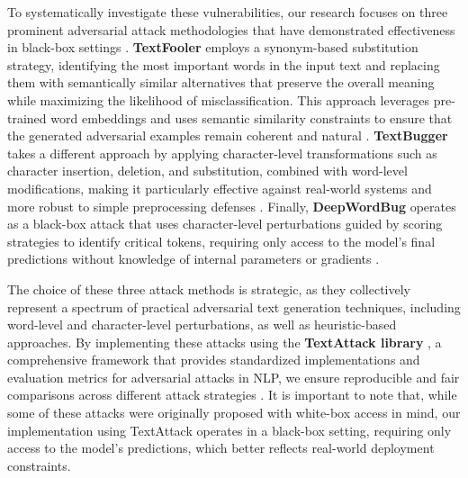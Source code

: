 \documentclass[../main.tex]{subfiles}
\begin{document}
To systematically investigate these vulnerabilities, our research focuses on three prominent adversarial attack methodologies that have demonstrated effectiveness in black-box settings \cite{morris2020textattack}. \textbf{TextFooler} \cite{jin2019textfooler} employs a synonym-based substitution strategy, identifying the most important words in the input text and replacing them with semantically similar alternatives that preserve the overall meaning while maximizing the likelihood of misclassification. This approach leverages pre-trained word embeddings and uses semantic similarity constraints to ensure that the generated adversarial examples remain coherent and natural \cite{jin2019textfooler}. \textbf{TextBugger} \cite{li2018textbugger} takes a different approach by applying character-level transformations such as character insertion, deletion, and substitution, combined with word-level modifications, making it particularly effective against real-world systems and more robust to simple preprocessing defenses \cite{li2018textbugger}. Finally, \textbf{DeepWordBug} \cite{gao2018deepwordbug} operates as a black-box attack that uses character-level perturbations guided by scoring strategies to identify critical tokens, requiring only access to the model's final predictions without knowledge of internal parameters or gradients \cite{gao2018deepwordbug}.

The choice of these three attack methods is strategic, as they collectively represent a spectrum of practical adversarial text generation techniques, including word-level and character-level perturbations, as well as heuristic-based approaches. By implementing these attacks using the \textbf{TextAttack library} \cite{morris2020textattack}, a comprehensive framework that provides standardized implementations and evaluation metrics for adversarial attacks in NLP, we ensure reproducible and fair comparisons across different attack strategies \cite{jin2019textfooler}. It is important to note that, while some of these attacks were originally proposed with white-box access in mind, our implementation using TextAttack operates in a black-box setting, requiring only access to the model's predictions, which better reflects real-world deployment constraints.
\end{document}
